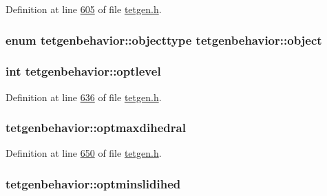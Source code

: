 Definition at line \hyperlink{tetgen_8h_source_l00605}{605} of file \hyperlink{tetgen_8h_source}{tetgen.\+h}.

\subsubsection[{\texorpdfstring{object}{object}}]{\setlength{\rightskip}{0pt plus 5cm}enum {\bf tetgenbehavior\+::objecttype}  tetgenbehavior\+::object}\hypertarget{classtetgenbehavior_ae01337ff20025a815a4f2e4d8c3d2871}{}\label{classtetgenbehavior_ae01337ff20025a815a4f2e4d8c3d2871}
\subsubsection[{\texorpdfstring{optlevel}{optlevel}}]{\setlength{\rightskip}{0pt plus 5cm}int tetgenbehavior\+::optlevel}\hypertarget{classtetgenbehavior_ae6d1777b2e5f9dad3921c778fc735717}{}\label{classtetgenbehavior_ae6d1777b2e5f9dad3921c778fc735717}


Definition at line \hyperlink{tetgen_8h_source_l00636}{636} of file \hyperlink{tetgen_8h_source}{tetgen.\+h}.

\subsubsection[{\texorpdfstring{optmaxdihedral}{optmaxdihedral}}]{ tetgenbehavior\+::optmaxdihedral}\hypertarget{classtetgenbehavior_a191cab44548550697e3d672c9966c61b}{}\label{classtetgenbehavior_a191cab44548550697e3d672c9966c61b}


Definition at line \hyperlink{tetgen_8h_source_l00650}{650} of file \hyperlink{tetgen_8h_source}{tetgen.\+h}.

\subsubsection[{\texorpdfstring{optminslidihed}{optminslidihed}}]{ tetgenbehavior\+::optminslidihed}\hypertarget{classtetgenbehavior_a7298676875d7609798023ec2df17ccb9}{}\label{classtetgenbehavior_a7298676875d7609798023ec2df17ccb9}


